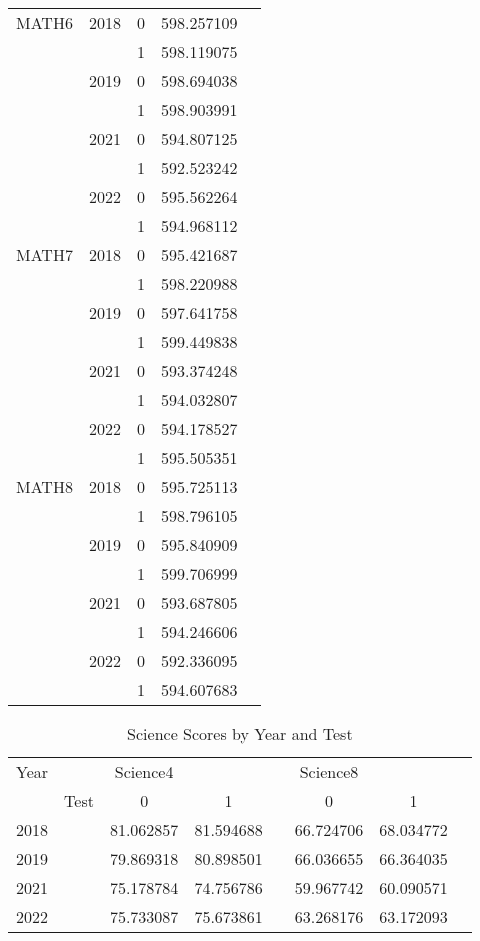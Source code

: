 \documentclass{article}
\begin{document}
\begin{table}[ht]
\begin{tabular}{@{}llccc@{}}
\midrule
MATH6            & 2018 & 0      & 598.257109         \\
                 &      & 1      & 598.119075         \\
                 & 2019 & 0      & 598.694038         \\
                 &      & 1      & 598.903991         \\
                 & 2021 & 0      & 594.807125         \\
                 &      & 1      & 592.523242         \\
                 & 2022 & 0      & 595.562264         \\
                 &      & 1      & 594.968112         \\
\midrule
MATH7            & 2018 & 0      & 595.421687         \\
                 &      & 1      & 598.220988         \\
                 & 2019 & 0      & 597.641758         \\
                 &      & 1      & 599.449838         \\
                 & 2021 & 0      & 593.374248         \\
                 &      & 1      & 594.032807         \\
                 & 2022 & 0      & 594.178527         \\
                 &      & 1 & 595.505351  \\
\midrule
MATH8 & 2018 & 0 & 595.725113 \\
& & 1 & 598.796105 \\
& 2019 & 0 & 595.840909 \\
& & 1 & 599.706999 \\
& 2021 & 0 & 593.687805 \\
& & 1 & 594.246606 \\
& 2022 & 0 & 592.336095 \\
& & 1 & 594.607683 \\

\bottomrule
\end{tabular}
\label{tab:ela_scores}
\end{table}



\begin{table}[ht]
\centering
\caption{Science Scores by Year and Test}
\begin{tabular}{@{}llcccccc@{}}
\toprule
Year &  & Science4 &  &  & Science8 &  &  \\
\cmidrule(lr){3-4} \cmidrule(lr){6-7}
 & Test & 0 & 1 &  & 0 & 1 &  \\
\midrule
2018 &  & 81.062857 & 81.594688 &  & 66.724706 & 68.034772 &  \\
2019 &  & 79.869318 & 80.898501 &  & 66.036655 & 66.364035 &  \\
2021 &  & 75.178784 & 74.756786 &  & 59.967742 & 60.090571 &  \\
2022 &  & 75.733087 & 75.673861 &  & 63.268176 & 63.172093 &  \\
\bottomrule
\end{tabular}
\label{tab:science_scores}
\end{table}
\end{document}

